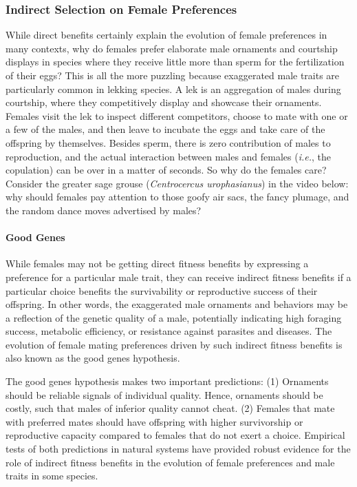 \documentclass[
]{book}
\begin{document}
\hypertarget{indirect-selection-on-female-preferences}{%
\subsubsection*{Indirect Selection on Female Preferences}\label{indirect-selection-on-female-preferences}}

While direct benefits certainly explain the evolution of female preferences in many contexts, why do females prefer elaborate male ornaments and courtship displays in species where they receive little more than sperm for the fertilization of their eggs? This is all the more puzzling because exaggerated male traits are particularly common in lekking species. A lek is an aggregation of males during courtship, where they competitively display and showcase their ornaments. Females visit the lek to inspect different competitors, choose to mate with one or a few of the males, and then leave to incubate the eggs and take care of the offspring by themselves. Besides sperm, there is zero contribution of males to reproduction, and the actual interaction between males and females (\emph{i.e.}, the copulation) can be over in a matter of seconds. So why do the females care? Consider the greater sage grouse (\emph{Centrocercus urophasianus}) in the video below: why should females pay attention to those goofy air sacs, the fancy plumage, and the random dance moves advertised by males?

\hypertarget{good-genes}{%
\paragraph*{Good Genes}\label{good-genes}}

While females may not be getting direct fitness benefits by expressing a preference for a particular male trait, they can receive indirect fitness benefits if a particular choice benefits the survivability or reproductive success of their offspring. In other words, the exaggerated male ornaments and behaviors may be a reflection of the genetic quality of a male, potentially indicating high foraging success, metabolic efficiency, or resistance against parasites and diseases. The evolution of female mating preferences driven by such indirect fitness benefits is also known as the good genes hypothesis.

The good genes hypothesis makes two important predictions: (1) Ornaments should be reliable signals of individual quality. Hence, ornaments should be costly, such that males of inferior quality cannot cheat. (2) Females that mate with preferred mates should have offspring with higher survivorship or reproductive capacity compared to females that do not exert a choice. Empirical tests of both predictions in natural systems have provided robust evidence for the role of indirect fitness benefits in the evolution of female preferences and male traits in some species.
\end{document}
